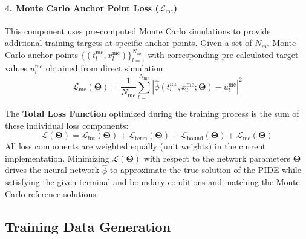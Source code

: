 \documentclass[11pt,twoside,openright]{report}
\begin{document}
\paragraph{4. Monte Carlo Anchor Point Loss ($\mathcal{L}_{\text{mc}}$)} This component uses pre-computed Monte Carlo simulations to provide additional training targets at specific anchor points. Given a set of $N_{\text{mc}}$ Monte Carlo anchor points $\{ (t_l^{\text{mc}}, x_l^{\text{mc}}) \}_{l=1}^{N_{\text{mc}}}$ with corresponding pre-calculated target values $u_l^{\text{mc}}$ obtained from direct simulation:
$$
\mathcal{L}_{\text{mc}}(\mathbf{\Theta}) = \frac{1}{N_{\text{mc}}} \sum_{l=1}^{N_{\text{mc}}} \left| \hat{\phi}(t_l^{\text{mc}}, x_l^{\text{mc}}; \mathbf{\Theta}) - u_l^{\text{mc}} \right|^2
$$

The \textbf{Total Loss Function} optimized during the training process is the sum of these individual loss components:
$$
\mathcal{L}(\mathbf{\Theta}) = \mathcal{L}_{\text{int}}(\mathbf{\Theta}) + \mathcal{L}_{\text{term}}(\mathbf{\Theta}) + \mathcal{L}_{\text{bound}}(\mathbf{\Theta}) + \mathcal{L}_{\text{mc}}(\mathbf{\Theta})
$$
All loss components are weighted equally (unit weights) in the current implementation. Minimizing $\mathcal{L}(\mathbf{\Theta})$ with respect to the network parameters $\mathbf{\Theta}$ drives the neural network $\hat{\phi}$ to approximate the true solution of the PIDE while satisfying the given terminal and boundary conditions and matching the Monte Carlo reference solutions.

\subsection{Training Data Generation}
\label{subsec:data_gen}
\end{document}
